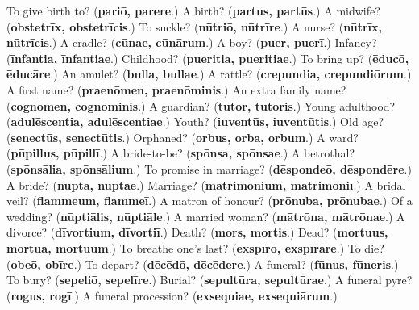\begin{tcolorbox}[breakable,colback=teal!4,colframe=teal!35!black,title={Before you move on}]
To give birth to? (\textbf{pariō, parere}.) A birth? (\textbf{partus, partūs}.) A midwife? (\textbf{obstetrīx, obstetrīcis}.) To suckle? (\textbf{nūtriō, nūtrīre}.) A nurse? (\textbf{nūtrīx, nūtrīcis}.) A cradle? (\textbf{cūnae, cūnārum}.) A boy? (\textbf{puer, puerī}.) Infancy? (\textbf{īnfantia, īnfantiae}.) Childhood? (\textbf{pueritia, pueritiae}.) To bring up? (\textbf{ēducō, ēducāre}.) An amulet? (\textbf{bulla, bullae}.) A rattle? (\textbf{crepundia, crepundiōrum}.) A first name? (\textbf{praenōmen, praenōminis}.) An extra family name? (\textbf{cognōmen, cognōminis}.) A guardian? (\textbf{tūtor, tūtōris}.) Young adulthood? (\textbf{adulēscentia, adulēscentiae}.) Youth? (\textbf{iuventūs, iuventūtis}.) Old age? (\textbf{senectūs, senectūtis}.) Orphaned? (\textbf{orbus, orba, orbum}.) A ward? (\textbf{pūpillus, pūpillī}.) A bride-to-be? (\textbf{spōnsa, spōnsae}.) A betrothal? (\textbf{spōnsālia, spōnsālium}.) To promise in marriage? (\textbf{dēspondeō, dēspondēre}.) A bride? (\textbf{nūpta, nūptae}.) Marriage? (\textbf{mātrimōnium, mātrimōniī}.) A bridal veil? (\textbf{flammeum, flammeī}.) A matron of honour? (\textbf{prōnuba, prōnubae}.) Of a wedding? (\textbf{nūptiālis, nūptiāle}.) A married woman? (\textbf{mātrōna, mātrōnae}.) A divorce? (\textbf{dīvortium, dīvortiī}.) Death? (\textbf{mors, mortis}.) Dead? (\textbf{mortuus, mortua, mortuum}.) To breathe one's last? (\textbf{exspīrō, exspīrāre}.) To die? (\textbf{obeō, obīre}.) To depart? (\textbf{dēcēdō, dēcēdere}.) A funeral? (\textbf{fūnus, fūneris}.) To bury? (\textbf{sepeliō, sepelīre}.) Burial? (\textbf{sepultūra, sepultūrae}.) A funeral pyre? (\textbf{rogus, rogī}.) A funeral procession? (\textbf{exsequiae, exsequiārum}.)
\end{tcolorbox}
